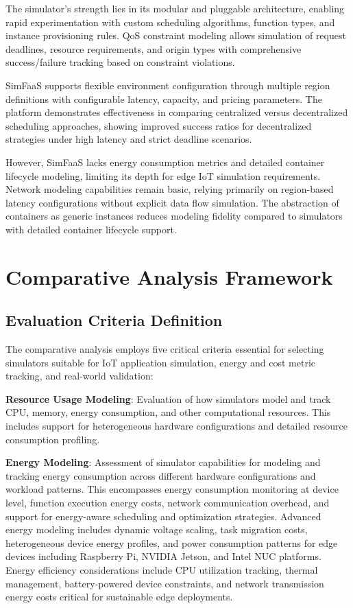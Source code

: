 The simulator's strength lies in its modular and pluggable architecture, enabling rapid experimentation with custom scheduling algorithms, function types, and instance provisioning rules. QoS constraint modeling allows simulation of request deadlines, resource requirements, and origin types with comprehensive success/failure tracking based on constraint violations.

SimFaaS supports flexible environment configuration through multiple region definitions with configurable latency, capacity, and pricing parameters. The platform demonstrates effectiveness in comparing centralized versus decentralized scheduling approaches, showing improved success ratios for decentralized strategies under high latency and strict deadline scenarios.

However, SimFaaS lacks energy consumption metrics and detailed container lifecycle modeling, limiting its depth for edge IoT simulation requirements. Network modeling capabilities remain basic, relying primarily on region-based latency configurations without explicit data flow simulation. The abstraction of containers as generic instances reduces modeling fidelity compared to simulators with detailed container lifecycle support.


\section{Comparative Analysis Framework}

\subsection{Evaluation Criteria Definition}

The comparative analysis employs five critical criteria essential for selecting simulators suitable for IoT application simulation, energy and cost metric tracking, and real-world validation:

\textbf{Resource Usage Modeling}: Evaluation of how simulators model and track CPU, memory, energy consumption, and other computational resources. This includes support for heterogeneous hardware configurations and detailed resource consumption profiling.

\textbf{Energy Modeling}: Assessment of simulator capabilities for modeling and tracking energy consumption across different hardware configurations and workload patterns. This encompasses energy consumption monitoring at device level, function execution energy costs, network communication overhead, and support for energy-aware scheduling and optimization strategies. Advanced energy modeling includes dynamic voltage scaling, task migration costs, heterogeneous device energy profiles, and power consumption patterns for edge devices including Raspberry Pi, NVIDIA Jetson, and Intel NUC platforms. Energy efficiency considerations include CPU utilization tracking, thermal management, battery-powered device constraints, and network transmission energy costs critical for sustainable edge deployments.

